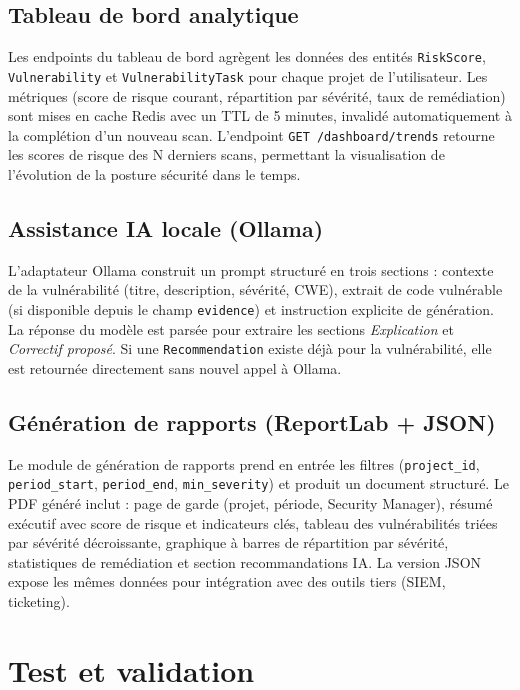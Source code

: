 \subsection{Tableau de bord analytique}
Les endpoints du tableau de bord agrègent les données des entités \texttt{RiskScore}, \texttt{Vulnerability} et \texttt{VulnerabilityTask} pour chaque projet de l'utilisateur. Les métriques (score de risque courant, répartition par sévérité, taux de remédiation) sont mises en cache Redis avec un TTL de 5 minutes, invalidé automatiquement à la complétion d'un nouveau scan. L'endpoint \texttt{GET /dashboard/trends} retourne les scores de risque des N derniers scans, permettant la visualisation de l'évolution de la posture sécurité dans le temps.

\subsection{Assistance IA locale (Ollama)}
L'adaptateur Ollama construit un prompt structuré en trois sections : contexte de la vulnérabilité (titre, description, sévérité, CWE), extrait de code vulnérable (si disponible depuis le champ \texttt{evidence}) et instruction explicite de génération. La réponse du modèle est parsée pour extraire les sections \textit{Explication} et \textit{Correctif proposé}. Si une \texttt{Recommendation} existe déjà pour la vulnérabilité, elle est retournée directement sans nouvel appel à Ollama.

\subsection{Génération de rapports (ReportLab + JSON)}
Le module de génération de rapports prend en entrée les filtres (\texttt{project\_id}, \texttt{period\_start}, \texttt{period\_end}, \texttt{min\_severity}) et produit un document structuré. Le PDF généré inclut : page de garde (projet, période, Security Manager), résumé exécutif avec score de risque et indicateurs clés, tableau des vulnérabilités triées par sévérité décroissante, graphique à barres de répartition par sévérité, statistiques de remédiation et section recommandations IA. La version JSON expose les mêmes données pour intégration avec des outils tiers (SIEM, ticketing).

\section{Test et validation}

